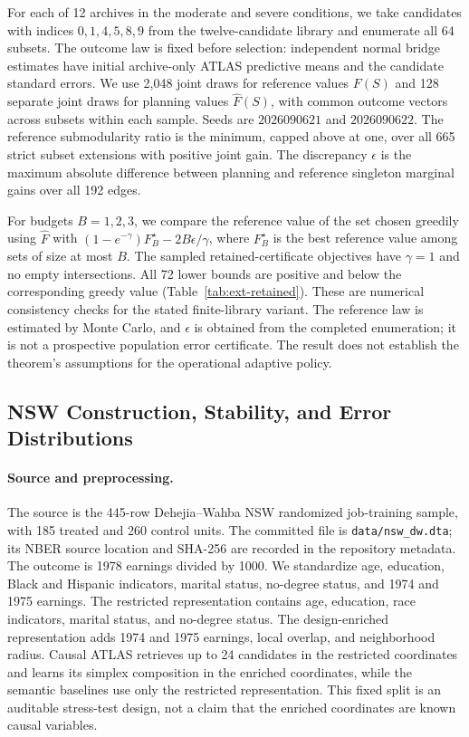 \documentclass[11pt]{article}
\numberwithin{equation}{section}
\newcommand{\1}{\mathbf 1}
\begin{document}
For each of 12 archives in the moderate and severe conditions, we take candidates with indices $0,1,4,5,8,9$ from the twelve-candidate library and enumerate all 64 subsets. The outcome law is fixed before selection: independent normal bridge estimates have initial archive-only ATLAS predictive means and the candidate standard errors. We use 2,048 joint draws for reference values $F(S)$ and 128 separate joint draws for planning values $\widehat F(S)$, with common outcome vectors across subsets within each sample. Seeds are $2026090621$ and $2026090622$. The reference submodularity ratio is the minimum, capped above at one, over all 665 strict subset extensions with positive joint gain. The discrepancy $\epsilon$ is the maximum absolute difference between planning and reference singleton marginal gains over all 192 edges.

For budgets $B=1,2,3$, we compare the reference value of the set chosen greedily using $\widehat F$ with $(1-e^{-\gamma})F_B^\star-2B\epsilon/\gamma$, where $F_B^\star$ is the best reference value among sets of size at most $B$. The sampled retained-certificate objectives have $\gamma=1$ and no empty intersections. All 72 lower bounds are positive and below the corresponding greedy value (Table~\ref{tab:ext-retained}). These are numerical consistency checks for the stated finite-library variant. The reference law is estimated by Monte Carlo, and $\epsilon$ is obtained from the completed enumeration; it is not a prospective population error certificate. The result does not establish the theorem's assumptions for the operational adaptive policy.



\subsection{NSW Construction, Stability, and Error Distributions}
\label{app:nsw-details}
\suppressfloats[t]

\paragraph{Source and preprocessing.}
The source is the 445-row Dehejia--Wahba NSW randomized job-training sample, with 185 treated and 260 control units.  The committed file is \texttt{data/nsw\_dw.dta}; its NBER source location and SHA-256 are recorded in the repository metadata.  The outcome is 1978 earnings divided by 1000.  We standardize age, education, Black and Hispanic indicators, marital status, no-degree status, and 1974 and 1975 earnings.  The restricted representation contains age, education, race indicators, marital status, and no-degree status.  The design-enriched representation adds 1974 and 1975 earnings, local overlap, and neighborhood radius.  Causal ATLAS retrieves up to 24 candidates in the restricted coordinates and learns its simplex composition in the enriched coordinates, while the semantic baselines use only the restricted representation.  This fixed split is an auditable stress-test design, not a claim that the enriched coordinates are known causal variables.
\end{document}
